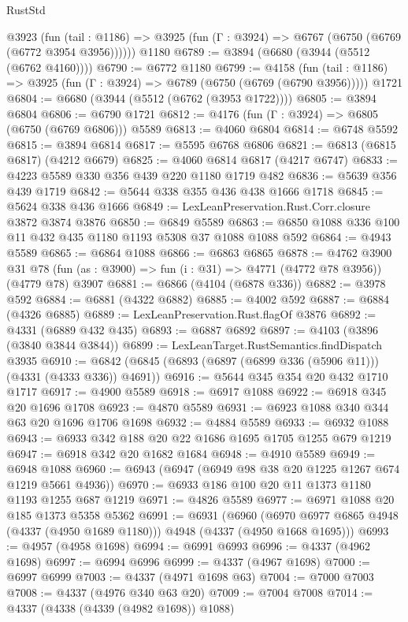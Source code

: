 \begin{lexlean}{RustStd}
\begin{coremodule}
    @3923
      (fun (tail : @1186) => @3925 (fun (Γ : @3924) => @6767 (@6750 (@6769 (@6772 @3954 @3956))))))
    @1180
@6789 := @3894 (@6680 (@3944 (@5512 (@6762 @4160))))
@6790 := @6772 @1180
@6799 := @4158
    (fun (tail : @1186) => @3925 (fun (Γ : @3924) => @6789 (@6750 (@6769 (@6790 @3956)))))
    @1721
@6804 := @6680 (@3944 (@5512 (@6762 (@3953 @1722))))
@6805 := @3894 @6804
@6806 := @6790 @1721
@6812 := @4176 (fun (Γ : @3924) => @6805 (@6750 (@6769 @6806))) @5589
@6813 := @4060 @6804
@6814 := @6748 @5592
@6815 := @3894 @6814
@6817 := @5595 @6768 @6806
@6821 := @6813 (@6815 @6817) (@4212 @6679)
@6825 := @4060 @6814 @6817 (@4217 @6747)
@6833 := @4223 @5589 @330 @356 @439 @220 @1180 @1719 @482
@6836 := @5639 @356 @439 @1719
@6842 := @5644 @338 @355 @436 @438 @1666 @1718
@6845 := @5624 @338 @436 @1666
@6849 := LexLeanPreservation.Rust.Corr.closure @3872 @3874 @3876
@6850 := @6849 @5589
@6863 := @6850 @1088 @336 @100 @11 @432 @435 @1180 @1193 @5308 @37 @1088 @1088 @592
@6864 := @4943 @5589
@6865 := @6864 @1088
@6866 := @6863 @6865
@6878 := @4762
    @3900
    @31
    @78
    (fun (as : @3900) => fun (i : @31) => @4771 (@4772 @78 @3956))
    (@4779 @78)
    @3907
@6881 := @6866 (@4104 (@6878 @336))
@6882 := @3978 @592
@6884 := @6881 (@4322 @6882)
@6885 := @4002 @592
@6887 := @6884 (@4326 @6885)
@6889 := LexLeanPreservation.Rust.flagOf @3876
@6892 := @4331 (@6889 @432 @435)
@6893 := @6887 @6892
@6897 := @4103 (@3896 (@3840 @3844 @3844))
@6899 := LexLeanTarget.RustSemantics.findDispatch @3935
@6910 := @6842 (@6845 (@6893 (@6897 (@6899 @336 (@5906 @11))) (@4331 (@4333 @336)) @4691))
@6916 := @5644 @345 @354 @20 @432 @1710 @1717
@6917 := @4900 @5589
@6918 := @6917 @1088
@6922 := @6918 @345 @20 @1696 @1708
@6923 := @4870 @5589
@6931 := @6923 @1088 @340 @344 @63 @20 @1696 @1706 @1698
@6932 := @4884 @5589
@6933 := @6932 @1088
@6943 := @6933 @342 @188 @20 @22 @1686 @1695 @1705 @1255 @679 @1219
@6947 := @6918 @342 @20 @1682 @1684
@6948 := @4910 @5589
@6949 := @6948 @1088
@6960 := @6943 (@6947 (@6949 @98 @38 @20 @1225 @1267 @674 @1219 @5661 @4936))
@6970 := @6933 @186 @100 @20 @11 @1373 @1180 @1193 @1255 @687 @1219
@6971 := @4826 @5589
@6977 := @6971 @1088 @20 @185 @1373 @5358 @5362
@6991 := @6931
    (@6960 (@6970 @6977 @6865 @4948 (@4337 (@4950 @1689 @1180))) @4948 (@4337 (@4950 @1668 @1695)))
@6993 := @4957 (@4958 @1698)
@6994 := @6991 @6993
@6996 := @4337 (@4962 @1698)
@6997 := @6994 @6996
@6999 := @4337 (@4967 @1698)
@7000 := @6997 @6999
@7003 := @4337 (@4971 @1698 @63)
@7004 := @7000 @7003
@7008 := @4337 (@4976 @340 @63 @20)
@7009 := @7004 @7008
@7014 := @4337 (@4338 (@4339 (@4982 @1698)) @1088)

\end{coremodule}
\end{lexlean}
